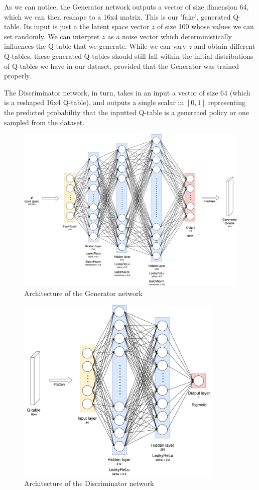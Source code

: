 As we can notice, the Generator network outputs a vector of size dimension 64, which we can then reshape to a 16x4 matrix. This is our 'fake', generated Q-table. Its input is just a the latent space vector $z$ of size 100 whose values we can set randomly. We can interpret $z$ as a noise vector which deterministically influences the Q-table that we generate. While we can vary $z$ and obtain different Q-tables, these generated Q-tables should still fall within the initial distributions of Q-tables we have in our dataset, provided that the Generator was trained properly.

The Discriminator network, in turn, takes in an input a vector of size 64 (which is a reshaped 16x4 Q-table), and outputs a single scalar in $[0,1]$ representing the predicted probability that the inputted Q-table is a generated policy or one sampled from the dataset.

\begin{figure}
\centering
\includegraphics[width=15cm]{Figures/Generator}
\caption{Architecture of the Generator network}
\label{fig:Generator}
\end{figure}

\begin{figure}
\centering
\includegraphics[width=10cm]{Figures/Discriminator}
\caption{Architecture of the Discriminator network}
\label{fig:Discriminator}
\end{figure}

